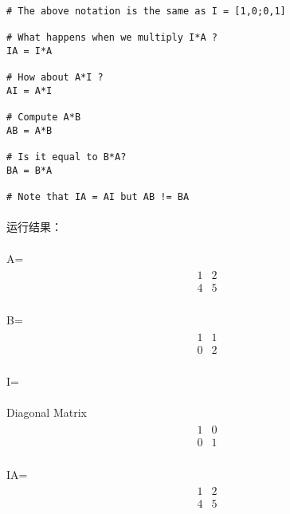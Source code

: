 \documentclass{article}
\begin{document}
\begin{CJK}{UTF8}{gbsn}
\begin{verbatim}
# The above notation is the same as I = [1,0;0,1]

# What happens when we multiply I*A ? 
IA = I*A 

# How about A*I ? 
AI = A*I 

# Compute A*B 
AB = A*B 

# Is it equal to B*A? 
BA = B*A 

# Note that IA = AI but AB != BA
\end{verbatim}
\paragraph{}
运行结果：
\paragraph{}
\hspace*{4cm}
A=
\begin{eqnarray*}
\begin{array}{cc}
1&2\\
4&5
\end{array}
\end{eqnarray*}
\paragraph{}
\hspace*{4cm}
B=
\begin{eqnarray*}
\begin{array}{cc}
1&1\\
0&2
\end{array}
\end{eqnarray*}
\paragraph{}
\hspace*{4cm}
I=
\paragraph{}
\hspace*{4cm}
Diagonal Matrix
\begin{eqnarray*}
\begin{array}{cc}
1&0\\
0&1
\end{array}
\end{eqnarray*}
\paragraph{}
\hspace*{4cm}
IA=
\begin{eqnarray*}
\begin{array}{cc}
1&2\\
4&5
\end{array}
\end{eqnarray*}

\end{CJK}
\end{document}
